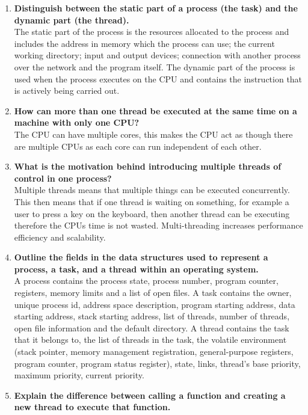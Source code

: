 
\begin{enumerate}
    \item \textbf{Distinguish between the static part of a process (the task) and the dynamic part (the thread).}\\
    The static part of the process is the resources allocated to the process and includes the address in memory which the process can use; the current working directory; input and output devices; connection with another process over the network and the program itself. The dynamic part of the process is used when the process executes on the CPU and contains the instruction that is actively being carried out. 
    \item \textbf{How can more than one thread be executed at the same time on a machine with only one CPU?}\\
    The CPU can have multiple cores, this makes the CPU act as though there are multiple CPUs as each core can run independent of each other.
    \item \textbf{What is the motivation behind introducing multiple threads of control in one process?}\\
    Multiple threads means that multiple things can be executed concurrently. This then means that if one thread is waiting on something, for example a user to press a key on the keyboard, then another thread can be executing therefore the CPUs time is not wasted. Multi-threading increases performance efficiency and scalability. 
    \item \textbf{Outline the fields in the data structures used to represent a process, a task, and a thread within an operating system.}\\
    A process contains the process state, process number, program counter, registers, memory limits and a list of open files. A task contains the owner, unique process id, address space description, program starting address, data starting address, stack starting address, list of threads, number of threads, open file information and the default directory. A thread contains the task that it belongs to, the list of threads in the task, the volatile environment (stack pointer, memory management registration, general-purpose registers, program counter, program status register), state, links, thread's base priority, maximum priority, current priority. 
    \item \textbf{Explain the difference between calling a function and creating a new thread to execute that function.}\\

\end{enumerate}
